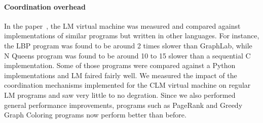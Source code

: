 \paragraph{Coordination overhead}

In the paper~\cite{cruz-ppdp14}, the LM virtual machine was measured and
compared against implementations of similar programs but written in other
languages. For instance, the LBP program was found to be around 2 times slower
than GraphLab, while N Queens program was found to be around 10 to 15 slower
than a sequential C implementation. Some of those programs were compared against
a Python implementations and LM faired fairly well. We measured
the impact of the coordination mechanisms implemented for the CLM
virtual machine on regular LM programs and saw very little to no degration.
Since we also performed general performance improvements, programs such as
PageRank and Greedy Graph Coloring programs now perform better than before.
